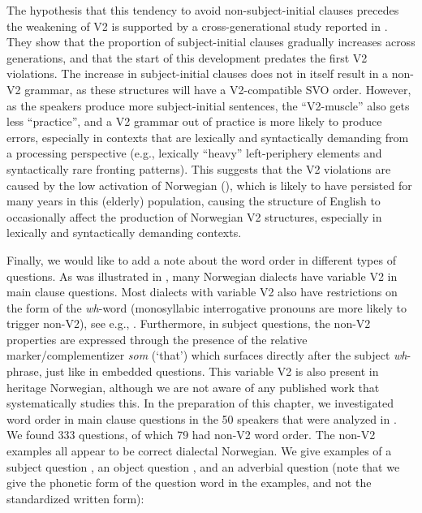 \documentclass[output=paper]{langscibook}
\begin{document}
The hypothesis that this tendency to avoid non\hyp subject\hyp initial clauses precedes the weakening of V2 is supported by a cross\hyp generational study reported in \citet{LarssonToappear}. They show that the proportion of subject\hyp initial clauses gradually increases across generations, and that the start of this development predates the first V2 violations. The increase in subject\hyp initial clauses does not in itself result in a non-V2 grammar, as these structures will have a V2-compatible SVO order. However, as the speakers produce more subject\hyp initial sentences, the “V2-muscle” also gets less “practice”, and a V2 grammar out of practice is more likely to produce errors, especially in contexts that are lexically and syntactically demanding from a processing perspective (e.g., lexically “heavy” left-periphery elements and syntactically rare fronting patterns). This suggests that the V2 violations are caused by the low activation of Norwegian (\citealt{PutnamSánchez2013}), which is likely to have persisted for many years in this (elderly) population, causing the structure of English to occasionally affect the production of Norwegian V2 structures, especially in lexically and syntactically demanding contexts.

Finally, we would like to add a note about the word order in different types of questions. As was illustrated in , many Norwegian dialects have variable V2 in main clause questions. Most dialects with variable V2 also have restrictions on the form of the \textit{wh}{}-word (monosyllabic interrogative pronouns are more likely to trigger non-V2), see e.g., \citet{Westergaard2009Microvariation,Westergaard2009Acquisition}. Furthermore, in subject questions, the non-V2 properties are expressed through the presence of the relative marker/complementizer \textit{som} (‘that’) which surfaces directly after the subject \textit{wh}{}-phrase, just like in embedded questions. This variable V2 is also present in heritage Norwegian, although we are not aware of any published work that systematically studies this. In the preparation of this chapter, we investigated word order in main clause questions in the 50 speakers that were analyzed in \citet{WestergaardEtAl2021}. We found 333 questions, of which 79 had non-V2 word order. The non-V2 examples all appear to be correct dialectal Norwegian. We give examples of a subject question , an object question , and an adverbial question  (note that we give the phonetic form of the question word in the examples, and not the standardized written form):   
\end{document}

